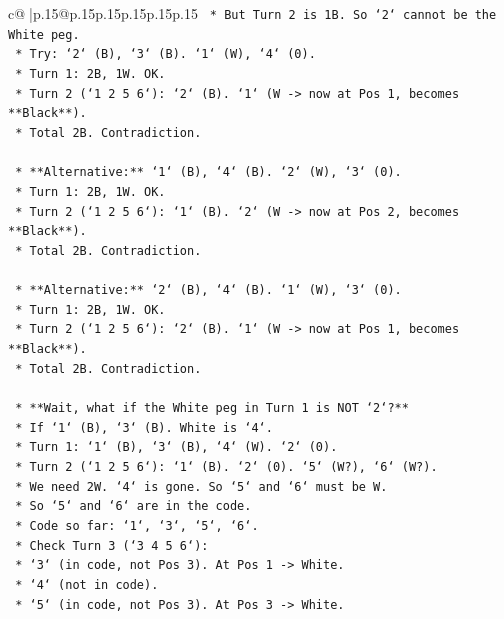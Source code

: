 \documentclass{article}
\begin{document}
{\begin{supertabular}{c@{$\;$}|p{.15\linewidth}@{}p{.15\linewidth}p{.15\linewidth}p{.15\linewidth}p{.15\linewidth}p{.15\linewidth}}
{{{\texttt{            *   But Turn 2 is 1B. So `2` cannot be the White peg.} \\
\texttt{        *   Try: `2` (B), `3` (B). `1` (W), `4` (0).} \\
\texttt{            *   Turn 1: 2B, 1W. OK.} \\
\texttt{            *   Turn 2 (`1 2 5 6`): `2` (B). `1` (W {-}> now at Pos 1, becomes **Black**).} \\
\texttt{            *   Total 2B. Contradiction.} \\
\\ 
\texttt{    *   **Alternative:** `1` (B), `4` (B). `2` (W), `3` (0).} \\
\texttt{        *   Turn 1: 2B, 1W. OK.} \\
\texttt{        *   Turn 2 (`1 2 5 6`): `1` (B). `2` (W {-}> now at Pos 2, becomes **Black**).} \\
\texttt{        *   Total 2B. Contradiction.} \\
\\ 
\texttt{    *   **Alternative:** `2` (B), `4` (B). `1` (W), `3` (0).} \\
\texttt{        *   Turn 1: 2B, 1W. OK.} \\
\texttt{        *   Turn 2 (`1 2 5 6`): `2` (B). `1` (W {-}> now at Pos 1, becomes **Black**).} \\
\texttt{        *   Total 2B. Contradiction.} \\
\\ 
\texttt{    *   **Wait, what if the White peg in Turn 1 is NOT `2`?**} \\
\texttt{        *   If `1` (B), `3` (B). White is `4`.} \\
\texttt{        *   Turn 1: `1` (B), `3` (B), `4` (W). `2` (0).} \\
\texttt{        *   Turn 2 (`1 2 5 6`): `1` (B). `2` (0). `5` (W?), `6` (W?).} \\
\texttt{        *   We need 2W. `4` is gone. So `5` and `6` must be W.} \\
\texttt{        *   So `5` and `6` are in the code.} \\
\texttt{        *   Code so far: `1`, `3`, `5`, `6`.} \\
\texttt{        *   Check Turn 3 (`3 4 5 6`):} \\
\texttt{            *   `3` (in code, not Pos 3). At Pos 1 {-}> White.} \\
\texttt{            *   `4` (not in code).} \\
\texttt{            *   `5` (in code, not Pos 3). At Pos 3 {-}> White.} \\
}}}
\end{supertabular}}
\end{document}
